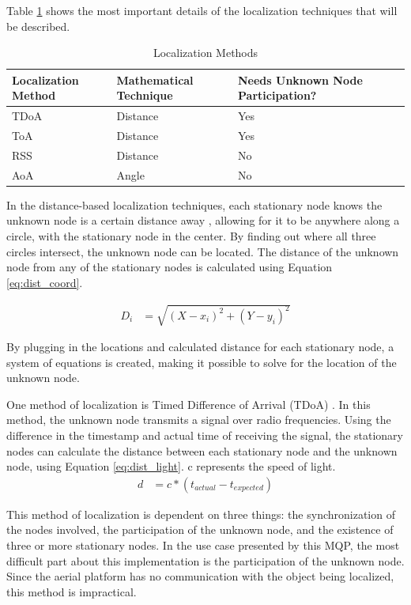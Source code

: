 Table \ref{table:local_methods} shows the most important details of the localization techniques that will be described. \par
\begin{table}[ht]
\centering
\caption{Localization Methods}
\label{table:local_methods}
\begin{tabular}{|l|l|l|l|}
    \hline
  Localization Method   & Mathematical Technique    & Needs Unknown Node Participation? & \\ \hline
         TDoA           & Distance                  & Yes                               & \\
          ToA           & Distance                  & Yes                               & \\
          RSS           & Distance                  & No                                & \\
          AoA           & Angle                     & No                                & \\
    \hline
\end{tabular}
\end{table}\par

In the distance-based localization techniques, each stationary node knows the unknown node is a certain distance away \cite{local_conf}, allowing for it to be anywhere along a circle, with the stationary node in the center. By finding out where all three circles intersect, the unknown node can be located. The distance of the unknown node from any of the stationary nodes is calculated using Equation \ref{eq:dist_coord}.\par 
\begin{align}\label{eq:dist_coord}
D_i &=\sqrt{(X - x_i)^2 + (Y-y_i)^2}
\end{align}\par
By plugging in the locations and calculated distance for each stationary node, a system of equations is created, making it possible to solve for the location of the unknown node.\par
One method of localization is Timed Difference of Arrival (TDoA) \cite{local_conf}. In this method, the unknown node transmits a signal over radio frequencies. Using the difference in the timestamp and actual time of receiving the signal, the stationary nodes can calculate the distance between each stationary node and the unknown node, using Equation \ref{eq:dist_light}. c represents the speed of light.
\begin{align}\label{eq:dist_light} 
    d &= c*(t_{actual} - t_{expected}) 
\end{align} \par
This method of localization is dependent on three things: the synchronization of the nodes involved, the participation of the unknown node, and the existence of three or more stationary nodes. In the use case presented by this MQP, the most difficult part about this implementation is the participation of the unknown node. Since the aerial platform has no communication with the object being localized, this method is impractical. \par

